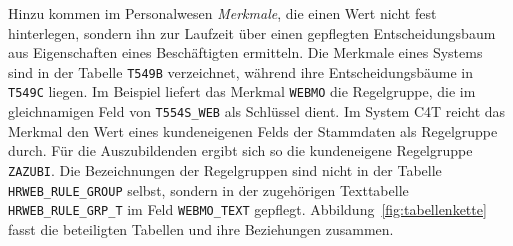 Hinzu kommen im Personalwesen \emph{Merkmale}, die einen Wert nicht fest hinterlegen, sondern ihn zur Laufzeit über einen gepflegten Entscheidungsbaum aus Eigenschaften eines Beschäftigten ermitteln. %
Die Merkmale eines Systems sind in der Tabelle \texttt{T549B} verzeichnet, während ihre Entscheidungsbäume in \texttt{T549C} liegen. Im Beispiel liefert das Merkmal \texttt{WEBMO} die Regelgruppe, die im gleichnamigen Feld von \texttt{T554S\_WEB} als Schlüssel dient. Im System C4T reicht das Merkmal den Wert eines kundeneigenen Felds der Stammdaten als Regelgruppe durch. Für die Auszubildenden ergibt sich so die kundeneigene Regelgruppe \texttt{ZAZUBI}. Die Bezeichnungen der Regelgruppen sind nicht in der Tabelle \texttt{HRWEB\_RULE\_GROUP} selbst, sondern in der zugehörigen Texttabelle \texttt{HRWEB\_RULE\_GRP\_T} im Feld \texttt{WEBMO\_TEXT} gepflegt. Abbildung~\ref{fig:tabellenkette} fasst die beteiligten Tabellen und ihre Beziehungen zusammen.


